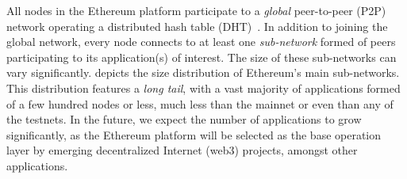 All nodes in the Ethereum platform participate to a \emph{global} peer-to-peer (P2P) network operating a distributed hash table (DHT)~\cite{maymounkov2002kademlia}.
In addition to joining the global network, every node connects to at least one \emph{sub-network} formed of peers participating to its application(s) of interest. 
The size of these sub-networks can vary significantly.
 depicts the size distribution of Ethereum's main sub-networks.
This distribution features a \emph{long tail}, with a vast majority of applications formed of a few hundred nodes or less, much less than the mainnet or even than any of the testnets.
In the future, we expect the number of applications to grow significantly, as the Ethereum platform will be selected as the base operation layer by emerging decentralized Internet (web3) projects, amongst other applications.

